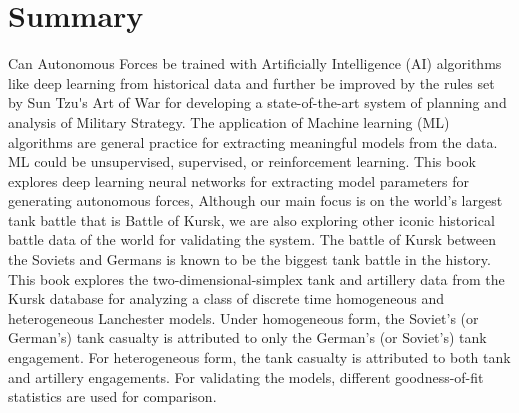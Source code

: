 \documentclass[]{article}
\begin{document}
\section*{Summary}
\justifying
Can \Gls{Autonomous Forces} be trained with Artificially Intelligence (AI) algorithms like \Gls{deep learning} from historical data and further be improved by the rules set by \Gls{Sun Tzu's Art of War} for developing a state-of-the-art system of planning and analysis of \Gls{Military Strategy}. The application of Machine learning (ML) algorithms are general practice for extracting meaningful models from the data. ML could be unsupervised, supervised, or reinforcement learning. This book explores deep learning neural networks for extracting model parameters for generating autonomous forces, Although our main focus is on the world's largest tank battle that is Battle of Kursk, we are also exploring other iconic historical battle data of the world for validating the system.  
The battle of Kursk between the Soviets and Germans is known to be the biggest tank battle in the history. This book explores the two-dimensional-simplex tank and artillery data from the Kursk database for analyzing a class of discrete time homogeneous and heterogeneous Lanchester models. Under homogeneous form, the Soviet’s (or German’s) tank casualty is attributed to only the German’s (or Soviet’s) tank engagement. For heterogeneous form, the tank casualty is attributed to both tank and artillery engagements. For validating the models, different goodness-of-fit statistics are used for comparison. 
\newpage




\tableofcontents
\newpage
\scriptsize
\listoffigures
\newpage
\listoftables
\newpage
 \thispagestyle{empty}
\normalsize
\end{document}
